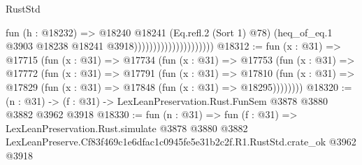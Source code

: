 \begin{lexlean}{RustStd}
\begin{coremodule}
                                          fun (h : @18232) =>
                                          @18240
                                            @18241
                                            (Eq.refl.{2} (Sort 1) @78)
                                            (heq_of_eq.{1}
                                              @3903
                                              @18238
                                              @18241
                                              @3918)))))))))))))))))))))
@18312 := fun (x : @31) =>
  @17715
    (fun (x : @31) =>
    @17734
      (fun (x : @31) =>
      @17753
        (fun (x : @31) =>
        @17772
          (fun (x : @31) =>
          @17791
            (fun (x : @31) =>
            @17810
              (fun (x : @31) => @17829 (fun (x : @31) => @17848 (fun (x : @31) => @18295))))))))
@18320 := (n : @31) -> (f : @31) -> LexLeanPreservation.Rust.FunSem @3878 @3880 @3882 @3962 @3918
@18330 := fun (n : @31) =>
  fun (f : @31) =>
  LexLeanPreservation.Rust.simulate
    @3878
    @3880
    @3882
    LexLeanPreserve.Cf83f469c1e6dfac1c0945fe5e31b2c2f.R1.RustStd.crate_ok
    @3962
    @3918
\end{coremodule}
\end{lexlean}

